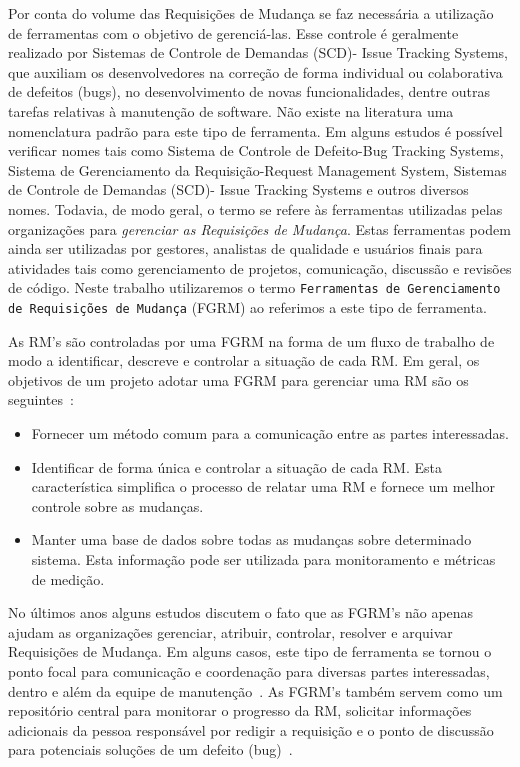 Por conta do volume das Requisições de Mudança se faz necessária a utilização de
ferramentas com o objetivo de gerenciá-las. Esse controle é geralmente realizado
por Sistemas de Controle de Demandas (SCD)- Issue Tracking Systems, que auxiliam
os desenvolvedores na correção de forma individual ou colaborativa de defeitos
(bugs), no desenvolvimento de novas funcionalidades, dentre outras tarefas
relativas à manutenção de software. Não existe na literatura uma nomenclatura
padrão para este tipo de ferramenta. Em alguns estudos é possível verificar
nomes tais como Sistema de Controle de Defeito\@-\@ Bug Tracking Systems,
Sistema de Gerenciamento da Requisição\@-\@ Request Management System, Sistemas
de Controle de Demandas (SCD)- Issue Tracking Systems e outros diversos nomes.
Todavia, de modo geral, o termo se refere às ferramentas utilizadas pelas
organizações para \textit{gerenciar as Requisições de Mudança}. Estas ferramentas
podem ainda ser utilizadas por gestores, analistas de qualidade e usuários
finais para atividades tais como gerenciamento de projetos, comunicação,
discussão e revisões de código. Neste trabalho utilizaremos o termo
\texttt{Ferramentas de Gerenciamento de Requisições de Mudança} (FGRM) ao
referimos a este tipo de ferramenta.

As RM's são controladas por uma FGRM na forma de um fluxo de trabalho de modo a
identificar, descreve e controlar a situação de cada RM. Em geral, os objetivos
de um projeto adotar uma FGRM para gerenciar uma RM são os
seguintes~\cite{tripathy2014software}:

\begin{itemize}
	\item Fornecer um método comum para a comunicação entre as partes
		interessadas.
	\item Identificar de forma única e controlar a situação de cada RM. Esta
		característica simplifica o processo de relatar uma RM e fornece um
		melhor controle sobre as mudanças.
	\item Manter uma base de dados sobre todas as mudanças sobre determinado
		sistema. Esta informação pode ser utilizada para monitoramento e
		métricas de medição.
\end{itemize}

No últimos anos alguns estudos discutem o fato que as FGRM's não apenas ajudam
as organizações gerenciar, atribuir, controlar, resolver e arquivar Requisições
de Mudança. Em alguns casos, este tipo de ferramenta se tornou o ponto focal
para comunicação e coordenação para diversas partes interessadas, dentro e além
da equipe de manutenção~\cite{Bertram:2010:CCB:1718918.1718972}.  As FGRM's
também servem como um repositório central para monitorar o progresso da RM,
solicitar informações adicionais da pessoa responsável por redigir a requisição
e o ponto de discussão para potenciais soluções de um defeito
(bug)~\cite{zimmermann2009improving}.

